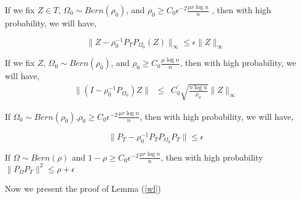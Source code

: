 \begin{fact}
\label{fact2}
If we fix $Z\in T$, $\Omega_{0}\sim Bern(\rho_{0})$, and $\rho_{0}\ge C_{0}\epsilon^{-2}\frac{\mu r\log n}{n}$ , then with high probability, we will have,

\label{fact5}
\[
\|Z-\rho_{0}^{-1}P_{T}P_{\Omega_{0}}(Z)\|_{\infty}\le\epsilon\|Z\|_{\infty}
\]

\begin{fact}
\label{fact3}
If we fix $Z$, $\Omega_{0}\sim Bern(\rho_{0})$, and $\rho_{0}\ge C_{0}\frac{\mu\log n}{n}$, then with high probability,
we will have,
\begin{eqnarray*}
\|(I-\rho_{0}^{-1}P_{\Omega_{0}})Z\| & \le & C_{0}^{'}\sqrt{\frac{n\log n}{\rho_{0}}}\|Z\|_{\infty}
\end{eqnarray*}

\begin{fact}
\label{fact4}
If $\Omega_{0}\sim Bern(\rho_{0})$,$\rho_{0}\ge C_{0}\epsilon^{-2}\frac{\mu r\log n}{n}$, then with high probability, we will have,

\[
\|P_{T}-\rho_{0}^{-1}P_{T}P_{\Omega_{0}}P_{T}\|\le\epsilon
\]

\begin{fact}
If $\Omega \sim Bern(\rho)$ and $1-\rho\ge C_{0}\epsilon^{-2}\frac{\mu r\log n}{n}$, then with high probability $\|P_{\Omega}P_{T}\|^{2}\le\rho+\epsilon$
\end{fact}
\end{fact}
\end{fact}
\end{fact}


Now we present the proof of Lemma (\ref{wl})

